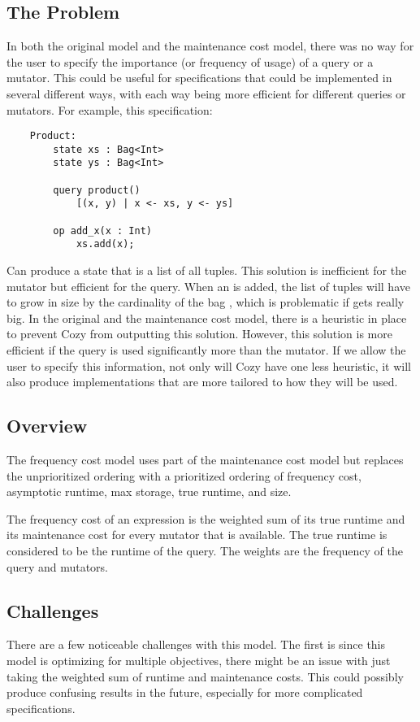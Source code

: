 \subsection{The Problem}
In both the original model and the maintenance cost model, there was no way for
the user to specify the importance (or frequency of usage) of a query or a
mutator. This could be useful for specifications that could be implemented in
several different ways, with each way being more efficient for different queries
or mutators. For example, this specification:

\begin{lstlisting}
    Product:
        state xs : Bag<Int>
        state ys : Bag<Int>

        query product()
            [(x, y) | x <- xs, y <- ys]

        op add_x(x : Int)
            xs.add(x);
\end{lstlisting}

Can produce a state that is a list of all  tuples. This solution is
inefficient for the mutator but efficient for the query. When an  is
added, the list of tuples will have to grow in size by the cardinality of the bag
, which is problematic if  gets really big. In the original
and the maintenance cost model, there is a heuristic in place to prevent Cozy
from outputting this solution. However, this solution is more efficient if
the query is used significantly more than the mutator. If we allow the user to
specify this information, not only will Cozy have one less heuristic, it will
also produce implementations that are more tailored to how they will be used.

\subsection{Overview}
The frequency cost model uses part of the maintenance cost model but replaces
the unprioritized ordering with a prioritized ordering of frequency cost,
asymptotic runtime, max storage, true runtime, and size.

The frequency cost of an expression is the weighted sum of its true runtime and
its maintenance cost for every mutator that is available. The true runtime is
considered to be the runtime of the query. The weights are the frequency of the
query and mutators.

\subsection{Challenges}
There are a few noticeable challenges with this model. The first is since this
model is optimizing for multiple objectives, there might be an issue with just
taking the weighted sum of runtime and maintenance costs. This could possibly
produce confusing results in the future, especially for more complicated
specifications.

